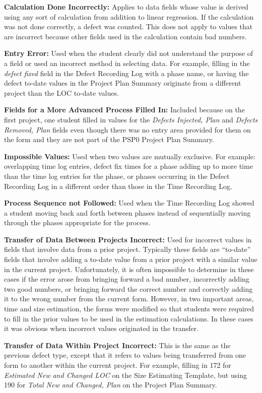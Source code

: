 {\bf Calculation Done Incorrectly:}
Applies to data fields whose value is derived using any
sort of calculation from addition to linear regression.  If the 
calculation
was not done correctly, a defect was counted.  This does not apply to
values that are incorrect because other fields used in the calculation
contain bad numbers.

{\bf Entry Error:}
Used when the student clearly did not understand the
purpose of a field or used an incorrect method in selecting data.  For
example, filling in the {\it defect fixed} field in the Defect Recording
Log with a phase name, or having the defect to-date values in the
Project Plan Summary originate from a different project than the LOC
to-date values.

{\bf Fields for a More Advanced Process Filled In:}
Included because on the first project, one student filled in values for 
the
{\it Defects Injected, Plan} and {\it Defects Removed, Plan} fields even
though there was no entry area provided for them on the form and
they are not part of the PSP0 Project Plan Summary.

{\bf Impossible Values:} Used when two values are mutually exclusive.  
For
example: overlapping time log entries, defect fix times for a phase 
adding
up to more time than the time log entries for the phase, or phases 
occurring
in the Defect Recording Log in a different order than those in the Time
Recording Log.

{\bf Process Sequence not Followed:} Used when the Time Recording Log 
showed a student
moving back and forth between phases instead of sequentially moving 
through
the phases appropriate for the process.

{\bf Transfer of Data Between Projects Incorrect:}
Used for incorrect values in fields that involve data from a prior
project.  Typically these fields are ``to-date'' fields that involve 
adding a
to-date value from a prior project with a similar value in the current 
project.
Unfortunately, it is often impossible to determine in these cases if the
error arose from bringing forward a bad number, incorrectly adding two 
good
numbers, or bringing forward the correct number and correctly adding it
to the wrong number from the current form.  However, in two important
areas, time and size estimation, the forms were modified so that 
students
were required to fill in the prior values to be used in the estimation
calculations. In these cases it was obvious when incorrect values
originated in the transfer.

{\bf Transfer of Data Within Project Incorrect:}
This is the same as the previous defect type, except that it refers to 
values
being transferred from one form to another within the current project.  
For
example, filling in 172 for {\it Estimated New and Changed LOC} on the 
Size
Estimating Template, but using 190 for {\it Total New and Changed, Plan} 
on
the Project Plan Summary.\\ \\

